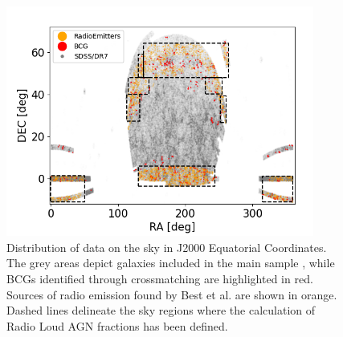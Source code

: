 \vspace{2cm}
\begin{figure}[hbtp]
  \centering
  \includegraphics[width=0.9\textwidth]{Fourth}
  \caption{Distribution of data on the sky in J2000 Equatorial Coordinates. The grey areas depict galaxies included in the main sample \cite{mpa-sdss-dr7}, while BCGs identified through crossmatching are highlighted in red. Sources of radio emission found by Best et al. \cite{2005MNRAS.362....9B} are shown in orange. Dashed lines delineate the sky regions where the calculation of Radio Loud AGN fractions has been defined. }
  \label{8}
\end{figure}


 
